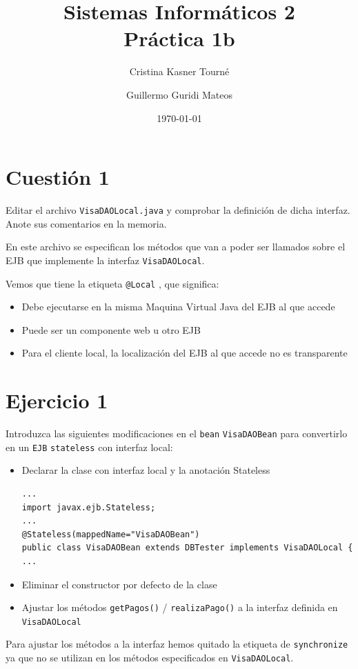 \documentclass[a4paper, 10pt]{article}
\title{Sistemas Informáticos 2\\Práctica 1b}
\author{Cristina Kasner Tourné\and Guillermo Guridi Mateos}
\date{\today}
\begin{document}

\section{Cuestión 1}
\begin{mdframed}
Editar el archivo \texttt{VisaDAOLocal.java} y comprobar la definición de dicha interfaz. Anote sus
comentarios en la memoria.
\end{mdframed}

	En este archivo se especifican los métodos que van a poder ser llamados sobre el EJB que implemente la interfaz \texttt{VisaDAOLocal}.

	Vemos que tiene la etiqueta \texttt{@Local} , que significa:
	\begin{itemize}
		\item Debe ejecutarse en la misma Maquina Virtual Java del EJB al que accede
		\item Puede ser un componente web u otro EJB
		\item Para el cliente local, la localización del EJB al que accede no es transparente
	\end{itemize}


\section{Ejercicio 1}
\begin{mdframed} 
Introduzca las siguientes modificaciones en el \texttt{bean} \texttt{VisaDAOBean} para convertirlo en un \texttt{EJB}
\texttt{stateless} con interfaz local:
\begin{itemize}
\item Declarar la clase con interfaz local y la anotación Stateless
\lstset{language=java}
\begin{lstlisting}
...
import javax.ejb.Stateless;
...
@Stateless(mappedName="VisaDAOBean")
public class VisaDAOBean extends DBTester implements VisaDAOLocal {
...
\end{lstlisting}
\item Eliminar el constructor por defecto de la clase
\item Ajustar los métodos \texttt{getPagos()} / \texttt{realizaPago()} a la interfaz definida en \texttt{VisaDAOLocal}
\end{itemize}
\end{mdframed}

	Para ajustar los métodos a la interfaz hemos quitado la etiqueta de \texttt{synchronize} ya que no se utilizan en los métodos especificados en \texttt{VisaDAOLocal}.
\end{document}
